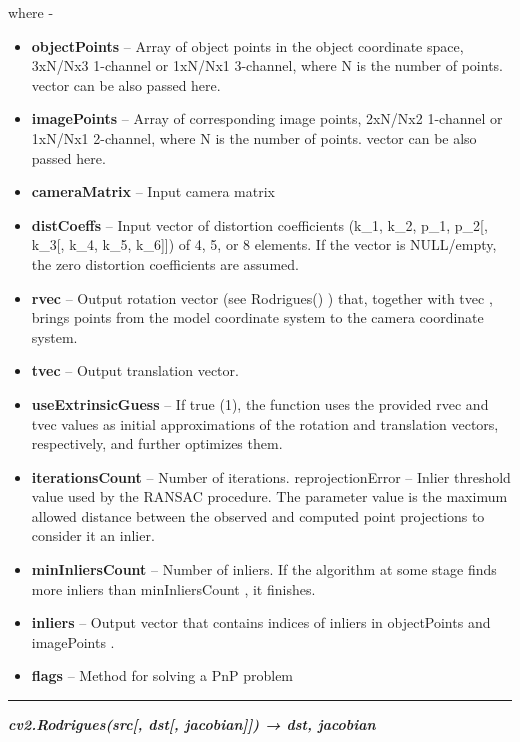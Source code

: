 \documentclass[]{article}
\begin{document}
where -

\begin{itemize}
\item
  \textbf{objectPoints} -- Array of object points in the object
  coordinate space, 3xN/Nx3 1-channel or 1xN/Nx1 3-channel, where N is
  the number of points. vector can be also passed here.
\item
  \textbf{imagePoints} -- Array of corresponding image points, 2xN/Nx2
  1-channel or 1xN/Nx1 2-channel, where N is the number of points.
  vector can be also passed here.
\item
  \textbf{cameraMatrix} -- Input camera matrix
\item
  \textbf{distCoeffs} -- Input vector of distortion coefficients (k\_1,
  k\_2, p\_1, p\_2{[}, k\_3{[}, k\_4, k\_5, k\_6{]}{]}) of 4, 5, or 8
  elements. If the vector is NULL/empty, the zero distortion
  coefficients are assumed.
\item
  \textbf{rvec} -- Output rotation vector (see Rodrigues() ) that,
  together with tvec , brings points from the model coordinate system to
  the camera coordinate system.
\item
  \textbf{tvec} -- Output translation vector.
\item
  \textbf{useExtrinsicGuess} -- If true (1), the function uses the
  provided rvec and tvec values as initial approximations of the
  rotation and translation vectors, respectively, and further optimizes
  them.
\item
  \textbf{iterationsCount} -- Number of iterations. reprojectionError --
  Inlier threshold value used by the RANSAC procedure. The parameter
  value is the maximum allowed distance between the observed and
  computed point projections to consider it an inlier.
\item
  \textbf{minInliersCount} -- Number of inliers. If the algorithm at
  some stage finds more inliers than minInliersCount , it finishes.
\item
  \textbf{inliers} -- Output vector that contains indices of inliers in
  objectPoints and imagePoints .
\item
  \textbf{flags} -- Method for solving a PnP problem
\end{itemize}

\begin{center}\rule{0.5\linewidth}{\linethickness}\end{center}

\emph{\textbf{cv2.Rodrigues(src{[}, dst{[}, jacobian{]}{]}) → dst,
jacobian}}
\end{document}
